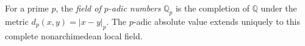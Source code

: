 
For a prime $p$, the \emph{field of $p$-adic numbers} $\mathbb Q_p$ is the completion of $\mathbb Q$ under the metric $d_p(x,y)=|x-y|_p$. The $p$-adic absolute value extends uniquely to this complete nonarchimedean local field.
